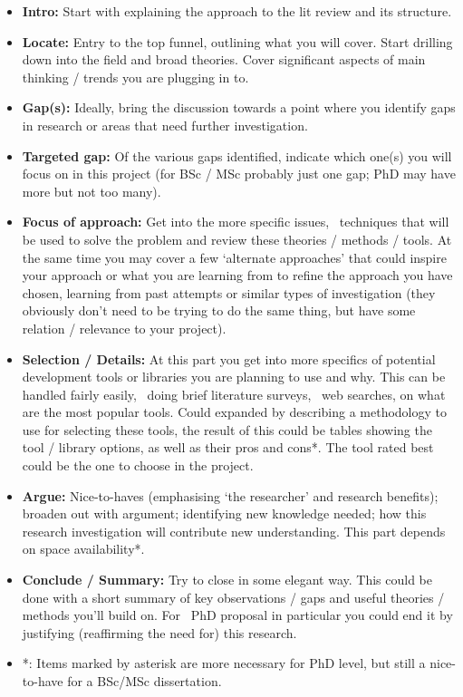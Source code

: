 \begin{itemize}
  \item \textbf{Intro:} Start with explaining the approach to the lit review and its structure.
  
  \item \textbf{Locate:} Entry to the top funnel, outlining what you will cover. Start drilling down into the field and broad theories. Cover significant aspects of main thinking / trends you are plugging in to.
  
  \item \textbf{Gap(s):} Ideally, bring the discussion towards a point where you identify gaps in research or areas that need further investigation.
  
  \item \textbf{Targeted gap:} Of the various gaps identified, indicate which one(s) you will focus on in this project (for BSc / MSc probably just one gap; PhD may have more but not too many).
  
  \item \textbf{Focus of approach:} Get into the more specific issues, \ie~techniques that will be used to solve the problem and review these theories / methods / tools.
  At the same time you may cover a few `alternate approaches' that could inspire your approach or what you are learning from to refine the approach you have chosen, learning from past attempts or similar types of investigation (they obviously don't need to be trying to do the same thing, but have some relation / relevance to your project).
  
  \item \textbf{Selection / Details:} At this part you get into more specifics of potential development tools or libraries you are planning to use and why.
  This can be handled fairly easily, \eg~doing brief literature surveys, \eg~web searches, on what are the most popular tools. Could expanded by describing a methodology to use for selecting these tools, the result of this could be tables showing the tool / library options, as well as their pros and cons*.  The tool rated best could be the one to choose in the project.
  
  \item \textbf{Argue:} Nice-to-haves (emphasising `the researcher' and research benefits); broaden out with argument; identifying new knowledge needed; how this research investigation will contribute new understanding. This part depends on space availability*.
  
  \item \textbf{Conclude / Summary:} Try to close in some elegant way.  This could be done with a short summary of key observations / gaps and useful theories / methods you'll build on. For \eg~PhD proposal in particular you could end it by justifying (reaffirming the need for) this research.
  
  \item *: Items marked by asterisk are more necessary for PhD level, but still a nice-to-have for a BSc/MSc dissertation.
\end{itemize}

